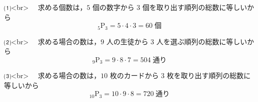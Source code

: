 ⑴<br>
　求める個数は，$5$ 個の数字から $3$ 個を取り出す順列の総数に等しいから
$$
  _{5}\mathrm{P}_{3} = 5 \cdot 4 \cdot 3 = 60 \;\text{個}
$$

⑵<br>
　求める場合の数は，$9$ 人の生徒から $3$ 人を選ぶ順列の総数に等しいから
$$
  _{9}\mathrm{P}_{3} = 9 \cdot 8 \cdot 7 = 504 \;\text{通り}
$$

⑶<br>
　求める場合の数は，$10$ 枚のカードから $3$ 枚を取り出す順列の総数に等しいから
$$
  _{10}\mathrm{P}_{3} = 10 \cdot 9 \cdot 8 = 720 \;\text{通り}
$$
